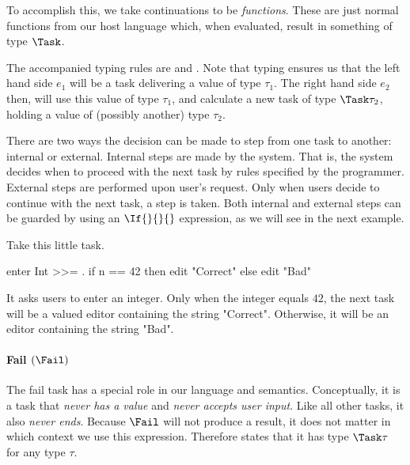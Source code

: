 To accomplish this,
we take continuations to be \emph{functions}.
These are just normal functions from our host language which,
when evaluated, result in something of type $\Task$.

The accompanied typing rules are  and .
Note that typing ensures us that the left hand side $e_1$ will be a task delivering a value of type $\tau_1$.
The right hand side $e_2$ then, will use this value of type $\tau_1$,
and calculate a new task of type $\Task \tau_2$,
holding a value of (possibly another) type $\tau_2$.

There are two ways the decision can be made to step from one task to another:
internal or external.
Internal steps are made by the system.
That is, the system decides when to proceed with the next task by rules specified by the programmer.
External steps are performed upon user's request.
Only when users decide to continue with the next task,
a step is taken.
Both internal and external steps can be guarded by using an $\If{}{}{}$ expression,
as we will see in the next example.



\begin{example}
\label{exm:conditions}

Take this little task.
\begin{TASK}
  enter Int >>= \n. if n == 42 then edit "Correct" else edit "Bad"
\end{TASK}
It asks users to enter an integer.
Only when the integer equals $42$, the next task will be a valued editor containing the string "Correct".
Otherwise, it will be an editor containing the string "Bad".

\end{example}




\paragraph{Fail $(\Fail)$}

The fail task has a special role in our language and semantics.
Conceptually, it is a task that \emph{never has a value} and \emph{never accepts user input}.
Like all other tasks, it also \emph{never ends}.
Because $\Fail$ will not produce a result,
it does not matter in which context we use this expression.
Therefore  states that it has type $\Task \tau$ for any type $\tau$.

